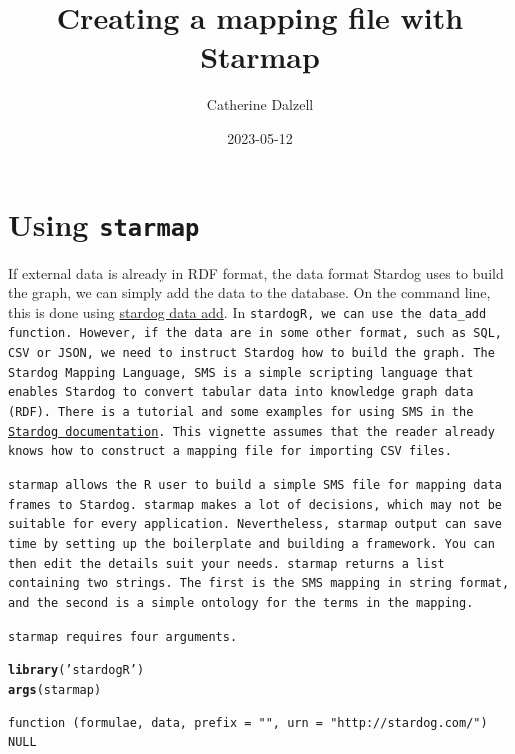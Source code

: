 \documentclass{article}\usepackage[]{graphicx}\usepackage[]{xcolor}
\title{Creating a mapping file with Starmap}
\author{Catherine Dalzell}
\date{2023-05-12}
\makeatletter
\newcommand{\hlstr}[1]{\textcolor[rgb]{0.192,0.494,0.8}{#1}}%
\newcommand{\hlstd}[1]{\textcolor[rgb]{0.345,0.345,0.345}{#1}}%
\newcommand{\hlkwd}[1]{\textcolor[rgb]{0.737,0.353,0.396}{\textbf{#1}}}%
\newenvironment{kframe}{%
 \def\at@end@of@kframe{}%
 \ifinner\ifhmode%
  \def\at@end@of@kframe{\end{minipage}}%
  \begin{minipage}{\columnwidth}%
 \fi\fi%
 \def\FrameCommand##1{\hskip\@totalleftmargin \hskip-\fboxsep
 \colorbox{shadecolor}{##1}\hskip-\fboxsep
     \hskip-\linewidth \hskip-\@totalleftmargin \hskip\columnwidth}%
 \MakeFramed {\advance\hsize-\width
   \@totalleftmargin\z@ \linewidth\hsize
   \@setminipage}}%
 {\par\unskip\endMakeFramed%
 \at@end@of@kframe}
\newenvironment{knitrout}{}{} %
\makeatother
\begin{document}
\maketitle

\tableofcontents

\section{Using \tt{starmap}}

If external data is already in RDF format, the data format Stardog uses to build the graph, we can simply add the data to the database. On the command line, this is done using \href{https://docs.stardog.com/stardog-cli-reference/data/data-add}{stardog data add}. In \tt{stardogR}, we can use the \tt{data\_add} function. However, if the data are in some other format, such as SQL, CSV or JSON, we need to instruct Stardog how to build the graph. The Stardog Mapping Language, \tt{SMS} is a simple scripting language that enables Stardog to convert tabular data into knowledge graph data (RDF). There is a tutorial and some examples for using SMS in the \href{https://docs.stardog.com/virtual-graphs/importing-json-csv-files}{Stardog documentation}. This vignette assumes that the reader already knows how to construct a mapping file for importing CSV files.

\tt{starmap} allows the R user to build a simple SMS file for mapping data frames to Stardog. \tt{starmap} makes a lot of decisions, which may not be suitable for every application. Nevertheless, \tt{starmap} output can save time by setting up the boilerplate and building a framework. You can then edit the details suit your needs. \tt{starmap} returns a list containing two strings. The first is the SMS mapping in string format, and the second is a simple ontology for the terms in the mapping.

\tt{starmap} requires four arguments.


\begin{knitrout}
\color{fgcolor}\begin{kframe}
\begin{alltt}
\hlkwd{library}\hlstd{(}\hlstr{'stardogR'}\hlstd{)}
\hlkwd{args}\hlstd{(starmap)}
\end{alltt}
\begin{verbatim}
function (formulae, data, prefix = "", urn = "http://stardog.com/") 
NULL
\end{verbatim}
\end{kframe}
\end{knitrout}
\end{document}
